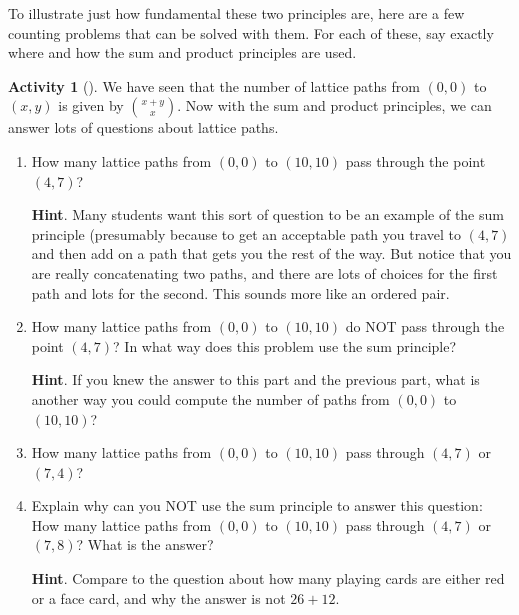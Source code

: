 \documentclass[10pt,]{book}
\theoremstyle{plain}
\theoremstyle{definition}
\theoremstyle{definition}
\theoremstyle{definition}
\newtheorem{activity}[project]{Activity}
\numberwithin{equation}{chapter}
\begin{document}
\hypertarget{p-625}{}%
To illustrate just how fundamental these two principles are, here are a few counting problems that can be solved with them.  For each of these, say exactly where and how the sum and product principles are used.%
\begin{activity}[]\label{act-latticepaths2}
\hypertarget{p-626}{}%
We have seen that the number of lattice paths from \((0,0)\) to \((x,y)\) is given by \(\binom{x+y}{x}\).  Now with the sum and product principles, we can answer lots of questions about lattice paths.%
\begin{enumerate}[font=\bfseries,label=(\alph*),ref=\alph*]
\item\label{task-127} \hypertarget{p-627}{}%
How many lattice paths from \((0,0)\) to \((10,10)\) pass through the point \((4,7)\)?%
\par\smallskip%
\noindent\textbf{Hint}.\hypertarget{hint-37}{}\quad%
\hypertarget{p-628}{}%
Many students want this sort of question to be an example of the sum principle (presumably because to get an acceptable path you travel to \((4,7)\) and then add on a path that gets you the rest of the way.  But notice that you are really concatenating two paths, and there are lots of choices for the first path and lots for the second.  This sounds more like an ordered pair.%
\item\label{task-128} \hypertarget{p-629}{}%
How many lattice paths from \((0,0)\) to \((10,10)\) do NOT pass through the point \((4,7)\)?  In what way does this problem use the sum principle?%
\par\smallskip%
\noindent\textbf{Hint}.\hypertarget{hint-38}{}\quad%
\hypertarget{p-630}{}%
If you knew the answer to this part and the previous part, what is another way you could compute the number of paths from \((0,0)\) to \((10,10)\)?%
\item\label{task-129} \hypertarget{p-631}{}%
How many lattice paths from \((0,0)\) to \((10,10)\) pass through \((4,7)\) or \((7,4)\)?%
\item\label{task-130} \hypertarget{p-632}{}%
Explain why can you NOT use the sum principle to answer this question: How many lattice paths from \((0,0)\) to \((10,10)\) pass through \((4,7)\) or \((7,8)\)?  What is the answer?%
\par\smallskip%
\noindent\textbf{Hint}.\hypertarget{hint-39}{}\quad%
\hypertarget{p-633}{}%
Compare to the question about how many playing cards are either red or a face card, and why the answer is not \(26 + 12\).%
\end{enumerate}
\end{activity}
\end{document}
